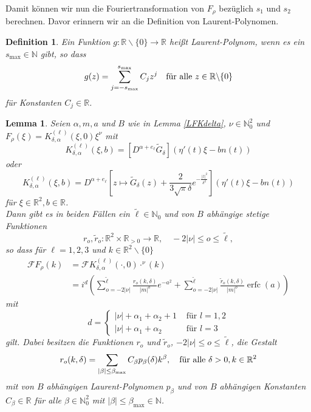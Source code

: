 \documentclass[12pt,a4paper]{scrartcl}
\newtheorem{Def}[Satz]{Definition}
\newtheorem{Lemma}[Satz]{Lemma}
\numberwithin{equation}{section}
\newcommand{\R}{\mathbb{R}} %
\newcommand{\N}{\mathbb{N}} %
\newcommand{\F}{\mathcal{F}} %
\newcommand{\erfc}{\operatorname{erfc}}
\newcommand{\fa}{\text{\quad für alle }}
\begin{document}
Damit können wir nun die Fouriertransformation von $F_\rho$ bezüglich $s_1$ und $s_2$ berechnen. Davor erinnern wir an die Definition von Laurent-Polynomen.
\begin{Def}
Ein Funktion $g:\R\backslash \{0\} \to \R$ heißt \emph{Laurent-Polynom}, wenn es ein $s_{\max}\in \N$ gibt, so dass
\[
g(z)= \sum_{j=-s_{\max}}^{s_{\max}} C_j z^{j} \fa z \in \R \backslash \{0\}
\]
für Konstanten $C_j\in \R$.
\end{Def}
\begin{Lemma} \label{LFFrho}
Seien $\alpha,m,a$ und $B$ wie in Lemma \ref{LFKdelta}, $\nu \in \N_0^2$ und 
$F_\rho(\xi) = K_{\delta,\alpha}^{(\ell)}(\xi,0)\xi^\nu$ mit 
\[
K_{\delta,\alpha}^{(\ell)}(\xi,b)=[D^{\alpha+e_\ell}\widetilde{G}_\delta](\eta'(t) \xi - b n(t))
\]
oder
\[
K_{\delta,\alpha}^{(\ell)}(\xi,b)=D^{\alpha+e_\ell}\left[z \mapsto \widetilde G_\delta(z) + \frac{2}{3 \sqrt{\pi} \delta } e^{-\frac{|z|^2}{\delta^2}}\right](\eta'(t) \xi - b n(t))
\]
für $\xi \in \R^2, b \in \R$. \\
Dann gibt es in beiden Fällen ein $\tilde \ell\in \N_0$ und von $B$ abhängige stetige  Funktionen \[
r_o,\tilde r_o: \R^2 \times \R_{>0} \to \R , \quad -2|\nu| \leq o \leq \tilde \ell,
\] so dass für $\ell=1,2,3$ und $k \in \R^2 \backslash \{0 \}$
\begin{align*}
\F F_\rho(k) &= \F K_{\delta,\alpha}^{(\ell)}(\cdot,0)\cdot^\nu (k) \\
&= i^{d} \left(\sum_{o=-2|\nu|}^{\tilde \ell} \frac{r_o(k,\delta)}{|m|^o}e^{-a^2} + \sum_{o=-2|\nu|}^{\tilde \ell} \frac{\tilde r_o(k,\delta)}{|m|^o}\erfc(a) \right)
\end{align*}
mit \[
d= 
\begin{cases} 
|\nu|+\alpha_1+\alpha_2+1 &\text{ für } l=1,2\\
|\nu|+\alpha_1+\alpha_2 &\text{ für } l=3
\end{cases}
\]
gilt.
Dabei besitzen die Funktionen $r_o$ und $\tilde r_o$, $-2|\nu|\leq o \leq \tilde \ell$, die Gestalt
\[
r_o(k,\delta) = \sum_{|\beta| \leq \beta_{\max}} C_{\beta} p_{\beta}(\delta)  k^{\beta}, \fa \delta>0, k \in \R^2
\]
mit von $B$ abhängigen Laurent-Polynomen $p_{\beta}$ und von $B$ abhängigen Konstanten $C_{\beta}\in \R$ für alle $\beta \in \N_0^2$ mit $|\beta|\leq \beta_{\max}\in \N$. 
 


\end{Lemma}
\end{document}
